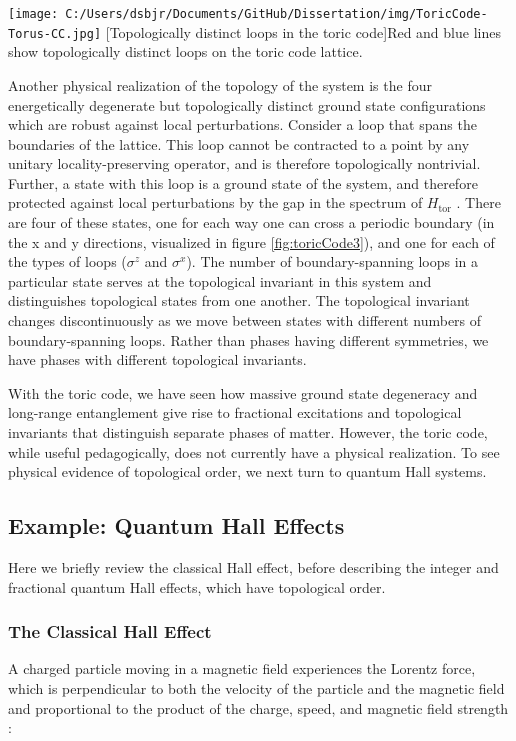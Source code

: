 \begin{centering}
\texttt{[image: C:/Users/dsbjr/Documents/GitHub/Dissertation/img/ToricCode-Torus-CC.jpg]}
  \captionsetup{width=0.75\textwidth}
  [Topologically distinct loops in the toric code]{Red and blue lines show topologically distinct loops on the toric code lattice.}
  \label{fig:toricCode3}
\end{centering}

Another physical realization of the topology of the system is the four energetically degenerate but topologically distinct ground state configurations which are robust against local perturbations. Consider a loop that spans the boundaries of the lattice. This loop cannot be contracted to a point by any unitary locality-preserving operator, and is therefore topologically nontrivial. Further, a state with this loop is a ground state of the system, and therefore protected against local perturbations by the gap in the spectrum of $H_{\text{tor}}$ \cite{Bravyi2010}. There are four of these states, one for each way one can cross a periodic boundary (in the x and y directions, visualized in figure \ref{fig:toricCode3}), and one for each of the types of loops ($\sigma^{z}$ and $\sigma^{x}$). The number of boundary-spanning loops in a particular state serves at the topological invariant in this system and distinguishes topological states from one another. The topological invariant changes discontinuously as we move between states with different numbers of boundary-spanning loops. Rather than phases having different symmetries, we have phases with different topological invariants.

With the toric code, we have seen how massive ground state degeneracy and long-range entanglement give rise to fractional excitations and topological invariants that distinguish separate phases of matter. However, the toric code, while useful pedagogically, does not currently have a physical realization. To see physical evidence of topological order, we next turn to quantum Hall systems.

\subsection{Example: Quantum Hall Effects}

Here we briefly review the classical Hall effect, before describing the integer and fractional quantum Hall effects, which have topological order.

\subsubsection{The Classical Hall Effect}
A charged particle moving in a magnetic field experiences the Lorentz force, which is perpendicular to both the velocity of the particle and the magnetic field and proportional to the product of the charge, speed, and magnetic field strength \cite{Griffiths1999}:

